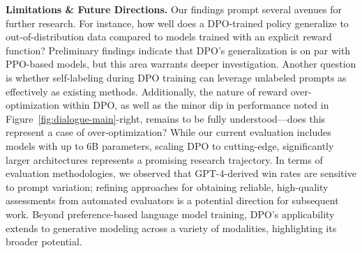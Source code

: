 \textbf{Limitations \& Future Directions.} Our findings prompt several avenues for further research. For instance, how well does a DPO-trained policy generalize to out-of-distribution data compared to models trained with an explicit reward function? Preliminary findings indicate that DPO’s generalization is on par with PPO-based models, but this area warrants deeper investigation. Another question is whether self-labeling during DPO training can leverage unlabeled prompts as effectively as existing methods. Additionally, the nature of reward over-optimization within DPO, as well as the minor dip in performance noted in Figure~\ref{fig:dialogue-main}-right, remains to be fully understood—does this represent a case of over-optimization? While our current evaluation includes models with up to 6B parameters, scaling DPO to cutting-edge, significantly larger architectures represents a promising research trajectory. In terms of evaluation methodologies, we observed that GPT-4-derived win rates are sensitive to prompt variation; refining approaches for obtaining reliable, high-quality assessments from automated evaluators is a potential direction for subsequent work. Beyond preference-based language model training, DPO’s applicability extends to generative modeling across a variety of modalities, highlighting its broader potential.